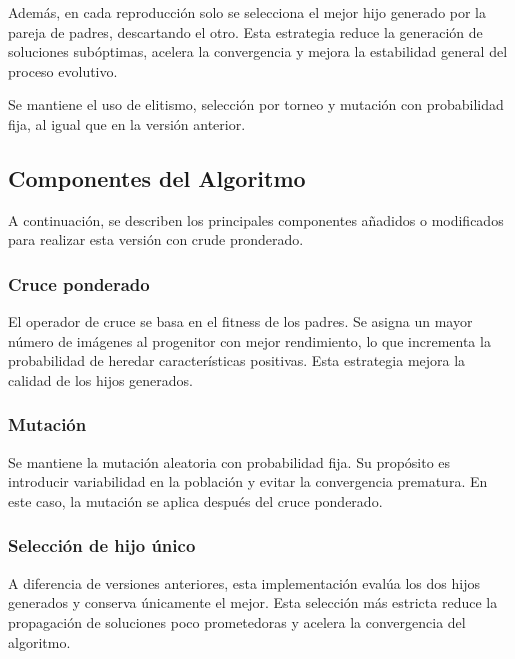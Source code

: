 Además, en cada reproducción solo se selecciona el mejor hijo generado por la pareja de padres, descartando el otro.
Esta estrategia reduce la generación de soluciones subóptimas, acelera la convergencia y mejora la estabilidad general del proceso evolutivo.

Se mantiene el uso de elitismo, selección por torneo y mutación con probabilidad fija, al igual que en la versión anterior.

\subsection{Componentes del Algoritmo}\label{subsec:componentes-genetico-v2}
A continuación, se describen los principales componentes añadidos o modificados para realizar esta versión con crude pronderado.

\subsubsection{Cruce ponderado}
El operador de cruce se basa en el fitness de los padres.
Se asigna un mayor número de imágenes al progenitor con mejor rendimiento, lo que incrementa la probabilidad de heredar características positivas.
Esta estrategia mejora la calidad de los hijos generados.

\subsubsection{Mutación}
Se mantiene la mutación aleatoria con probabilidad fija.
Su propósito es introducir variabilidad en la población y evitar la convergencia prematura.
En este caso, la mutación se aplica después del cruce ponderado.

\subsubsection{Selección de hijo único}
A diferencia de versiones anteriores, esta implementación evalúa los dos hijos generados y conserva únicamente el mejor.
Esta selección más estricta reduce la propagación de soluciones poco prometedoras y acelera la convergencia del algoritmo.


